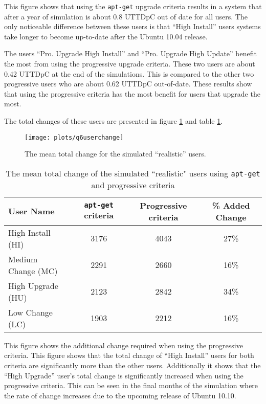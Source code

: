 This figure shows that using the \texttt{apt-get} upgrade criteria results in a system that after a year of simulation is about 0.8 UTTDpC out of date for all users. 
The only noticeable difference between these users is that ``High Install'' users systems take longer to become up-to-date after the Ubuntu 10.04 release.


The users ``Pro. Upgrade High Install'' and ``Pro. Upgrade High Update'' benefit the most from using the progressive upgrade criteria.
These two users are about 0.42 UTTDpC at the end of the simulations.
This is compared to the other two progressive users who are about 0.62 UTTDpC out-of-date.
These results show that using the progressive criteria has the most benefit for users that upgrade the most.      

The total changes of these users are presented in figure \ref{exp.q6userchange} and table \ref{exp.tblq6change}.
\begin{figure}[htp]
\begin{center}
  \texttt{[image: plots/q6userchange]}
  \caption{The mean total change for the simulated ``realistic'' users.}
  \label{exp.q6userchange}
\end{center}
\end{figure}

\begin{table}[h!]
\centering
\begin{tabular}{|l | c | c | c | }
\hline
User Name 				& \texttt{apt-get} criteria 		& Progressive criteria 	& \% Added Change	\\ \hline
High Install (HI)			& 3176			& 4043 	& 27\% 	\\
Medium Change (MC)			& 2291			& 2660 	& 16\% 	\\
High Upgrade (HU)			& 2123			& 2842	& 34\%   \\
Low Change 	(LC)			& 1903			& 2212 	& 16\%   \\ \hline
\end{tabular}
\caption{The mean total change of the simulated ``realistic" users using \texttt{apt-get} and progressive criteria}
\label{exp.tblq6change}
\end{table}

This figure shows the additional change required when using the progressive criteria.
This figure shows that the total change of  ``High Install'' users for both criteria are significantly more than the other users.
Additionally it shows that the ``High Upgrade'' user's total change is significantly increased when using the progressive criteria.
This can be seen in the final months of the simulation where the rate of change increases due to the upcoming release of Ubuntu 10.10.

